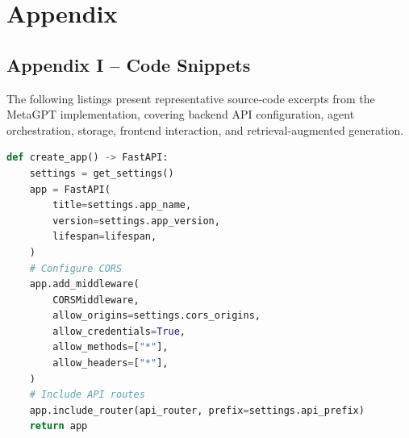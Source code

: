 
\clearpage
\chapter*{Appendix}

\vspace{1cm}


\section*{Appendix I -- Code Snippets}

\vspace{0.5cm}

The following listings present representative source-code excerpts from the MetaGPT implementation,
covering backend API configuration, agent orchestration, storage, frontend interaction, and
retrieval-augmented generation.

\vspace{0.5cm}

\begin{center}
\begin{minipage}{\linewidth}
\begin{lstlisting}[language=Python, caption={FastAPI application configuration and middleware setup}, label={lst:fastapi_setup}]
def create_app() -> FastAPI:
    settings = get_settings()
    app = FastAPI(
        title=settings.app_name,
        version=settings.app_version,
        lifespan=lifespan,
    )
    # Configure CORS
    app.add_middleware(
        CORSMiddleware,
        allow_origins=settings.cors_origins,
        allow_credentials=True,
        allow_methods=["*"],
        allow_headers=["*"],
    )
    # Include API routes
    app.include_router(api_router, prefix=settings.api_prefix)
    return app
\end{lstlisting}
\end{minipage}
\end{center}

\vspace{0.5cm}

